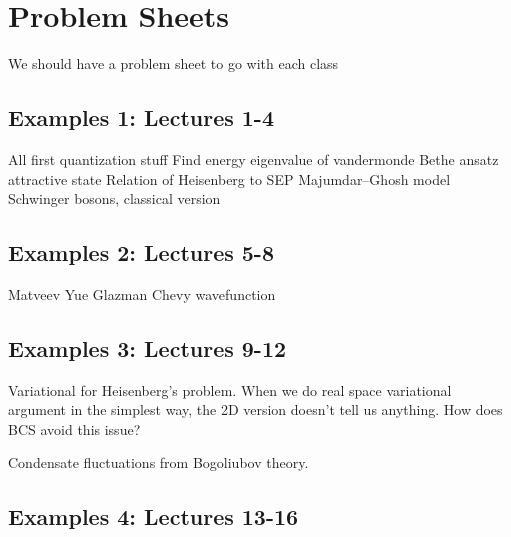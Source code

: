 \section{Problem Sheets}


We should have a problem sheet to go with each class

\subsection{Examples 1: Lectures 1-4}

All first quantization stuff
Find energy eigenvalue of vandermonde
Bethe ansatz attractive state
Relation of Heisenberg to SEP
Majumdar--Ghosh model
Schwinger bosons, classical version

\subsection{Examples 2: Lectures 5-8}

Matveev Yue Glazman
Chevy wavefunction

\subsection{Examples 3: Lectures 9-12}

Variational for Heisenberg's problem. When we do real space variational argument in the simplest way, the 2D version doesn't tell us anything. How does BCS avoid this issue?

Condensate fluctuations from Bogoliubov theory.

\subsection{Examples 4: Lectures 13-16}



